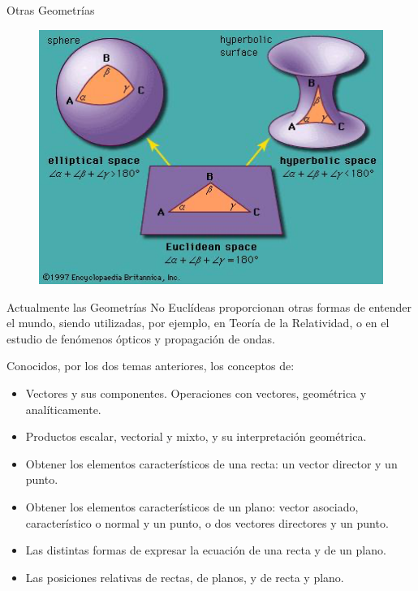 \begin{myexampleblock}{Otras Geometrías}
\begin{figure}[H]
		\centering
		\includegraphics[width=1\textwidth]{imagenes/imagenes11/T11IM01.png}
	\end{figure}

\vspace{2mm} Actualmente las Geometrías No Euclídeas proporcionan otras formas de entender el mundo, siendo utilizadas, por ejemplo, en Teoría de la Relatividad, o en el estudio de fenómenos ópticos y propagación de ondas. 

\vspace{2mm} 
\vspace{1mm} 
\end{myexampleblock}

\justify



Conocidos, por los dos temas anteriores, los conceptos de: 

\begin{itemize}
	
\item Vectores y sus componentes. Operaciones con vectores, geométrica y analíticamente. 
\item Productos escalar, vectorial y mixto, y su interpretación geométrica. 
\item Obtener los elementos característicos de una recta: un vector director y un punto. 
\item Obtener los elementos característicos de un plano: vector asociado, característico o normal y un punto, o dos vectores directores y un punto. 
\item Las distintas formas de expresar la ecuación de una recta y de un plano. 
\item Las posiciones relativas de rectas, de planos, y de recta y plano.
\end{itemize}


